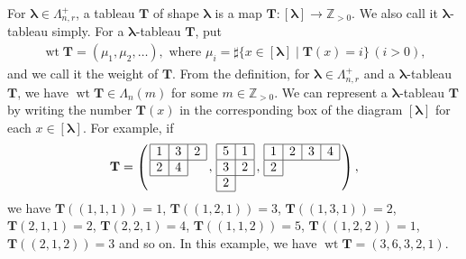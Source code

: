 \documentclass[12pt]{amsart}
\numberwithin{equation}{thm}
\newcommand\ZZ{\mathbb Z}
\newcommand\bT{\mathbf T}
\newcommand\vL{\varLambda}
\newcommand\Bla{\boldsymbol\lambda}
\newcommand\ra{\rightarrow}
\newcommand{\owt}{\operatorname{wt}}
\newcounter{ni}
\begin{document}
For $\Bla \in \vL_{n,r}^+$, 
a tableau $\bT$ of shape $\Bla$ is a map 
$\bT : [\Bla] \ra \ZZ_{>0} $. 
We also call it $\Bla$-tableau simply. 
For a $\Bla$-tableau $\bT$, put 
\begin{align*}
\owt \bT = (\mu_1,\mu_2,\dots ), 
\text{ where } \mu_i = \sharp \{ x \in [\Bla] \mid \bT(x) =i \} \, (i >0), 
\end{align*}
and we call it the weight of $\bT$. 
From the definition, 
for $\Bla \in \vL_{n,r}^+$ and a $\Bla$-tableau $\bT$, 
we have $\owt \bT \in \vL_n(m) $ for some $m \in \ZZ_{>0}$. 
We can represent a $\Bla$-tableau $\bT$ by writing the number $\bT(x)$ in the corresponding box of the diagram $[\Bla]$ 
for each $x \in [\Bla]$. 
For example, if 
\begin{align}
\label{example bT} 
\bT= \left( \, \begin{array}{|c|c|c|} \hline 1 & 3 & 2 \\ \hline 2 & 4 \\ \cline{1-2} \multicolumn{1}{c}{} \end{array} \, , 
	\, 
	\begin{array}{|c|c|c|} \hline 5 & 1 \\ \hline 3 & 2 \\ \hline 2 \\ \cline{1-1} \end{array} \, , 
	\, 
	\begin{array}{|c|c|c|c|} \hline 1 & 2 & 3 & 4 \\ \hline 2 \\ \cline{1-1} \multicolumn{1}{c}{} \end{array} 
	\, 
	\right), 
\end{align}
we have $\bT((1,1,1))=1$, $\bT((1,2,1)) =3$, $\bT((1,3,1)) =2$, $\bT(2,1,1)=2$, $\bT(2,2,1)=4$, 
$\bT((1,1,2))=5$, $\bT((1,2,2))=1$, $\bT((2,1,2))=3$ and so on. 
In this example, we have 
$\owt \bT = (3, 6, 3, 2,1)$. 
\end{document}

